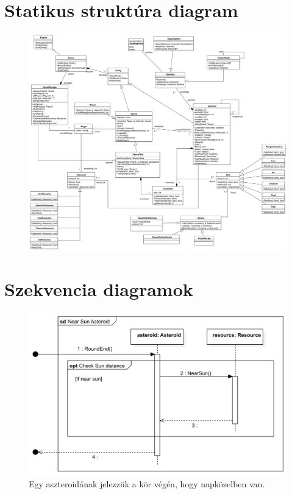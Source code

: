 \section{Statikus struktúra diagram}
\begin{figure}[H] 
\centering 
\includegraphics[width=1\textwidth]{docs/3_Project/svg/Design Model!Classes_1.png} 
\end{figure} 

\section{Szekvencia diagramok}
\begin{figure}[H] 
\centering 
\includegraphics[width=1\textwidth]{docs/3_Project/svg/Design Model!Sun Distance!Asteroid near sun!Near Sun Asteroid_4.png} 
\caption{Egy aszteroidának jelezzük a kör végén, hogy napközelben van.} 
\end{figure} 

